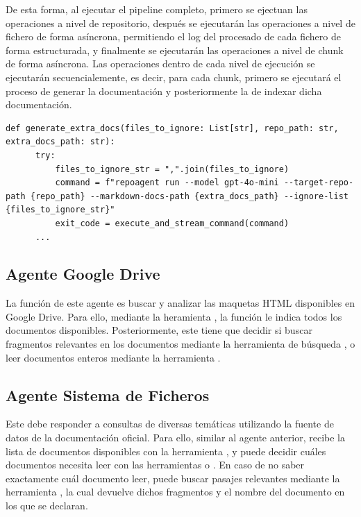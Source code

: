 De esta forma, al ejecutar el pipeline completo, primero se ejectuan las operaciones a nivel de repositorio, después se ejecutarán las operaciones a nivel de fichero de forma asíncrona, permitiendo el log del procesado de cada fichero de forma estructurada, y finalmente se ejecutarán las operaciones a nivel de chunk de forma asíncrona. Las operaciones dentro de cada nivel de ejecución se ejecutarán secuencialemente, es decir, para cada chunk, primero se ejecutará el proceso de generar la documentación y posteriormente la de indexar dicha documentación. 


\begin{lstlisting}[caption={\protect\opus{generate_extra_docs}: Ejecución de agente RepoAgent para crear la documentación API}, label={lst:spec_graph}]
  def generate_extra_docs(files_to_ignore: List[str], repo_path: str, extra_docs_path: str):
      try:
          files_to_ignore_str = ",".join(files_to_ignore)
          command = f"repoagent run --model gpt-4o-mini --target-repo-path {repo_path} --markdown-docs-path {extra_docs_path} --ignore-list {files_to_ignore_str}"
          exit_code = execute_and_stream_command(command)
      ...
\end{lstlisting}

\subsection{Agente Google Drive}
La función de este agente es buscar y analizar las maquetas HTML disponibles en Google Drive. Para ello, mediante la heramienta , la función  le indica todos los documentos disponibles. Posteriormente, este tiene que decidir si buscar fragmentos relevantes en los documentos mediante la herramienta de búsqueda , o leer documentos enteros mediante la herramienta .

\subsection{Agente Sistema de Ficheros}
Este debe responder a consultas de diversas temáticas utilizando la fuente de datos de la documentación oficial. Para ello, similar al agente anterior, recibe la lista de documentos disponibles con la herramienta , y puede decidir cuáles documentos necesita leer con las herramientas  o . En caso de no saber exactamente cuál documento leer, puede buscar pasajes relevantes mediante la herramienta , la cual devuelve dichos fragmentos y el nombre del documento en los que se declaran.

